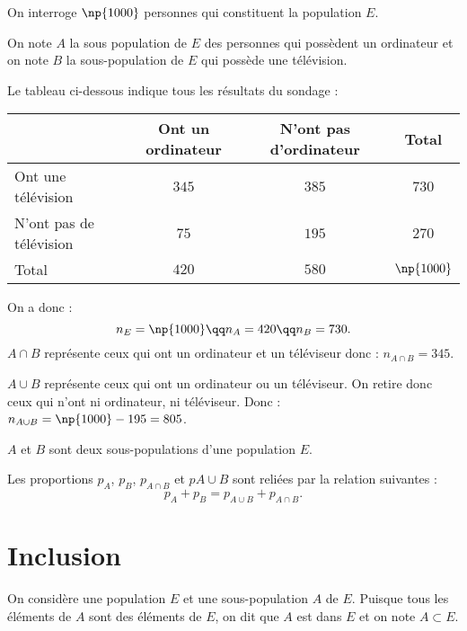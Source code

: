 \documentclass[10pt,openright,twoside,french]{book}
\begin{document}
\begin{Exemple}
    On interroge $\np{1000}$ personnes qui constituent la population $E$.\par
    On note $A$ la sous population de $E$ des personnes qui possèdent un ordinateur et on note $B$ la sous-population de $E$ qui possède une télévision.\par
    Le tableau ci-dessous indique tous les résultats du sondage :\medskip
    
    \begin{center}
    \renewcommand\arraystretch{1.5}
        \begin{tabular}{|l|c|c|c|}
            \cline{2-4}
                \multicolumn{1}{c|}{} & Ont un ordinateur & N'ont pas d'ordinateur & Total \\
            \hline
                Ont une télévision & $345$ & $385$ & $730$ \\
            \hline
                N'ont pas de télévision & $75$ & $195$ & $270$ \\
            \hline
                Total & $420$ & $580$ & $\np{1000}$ \\
            \hline
        \end{tabular}
    \end{center}
    On a donc :
    \[n_E = \np{1000} \qq n_A = 420 \qq n_B = 730.\]
    $A \cap B$ représente ceux qui ont un ordinateur et un téléviseur donc : $n_{A\cap B} = 345$.\par
    $A \cup B$ représente ceux qui ont un ordinateur ou un téléviseur. On retire donc ceux qui n'ont ni ordinateur, ni téléviseur. Donc : $n_{A \cup B} = \np{1000} - 195 = 805$.
\end{Exemple}

\begin{Prop}
    $A$ et $B$ sont deux sous-populations d'une population $E$.\par
    Les proportions $p_A$, $p_B$, $p_{A \cap B}$ et $p{A \cup B}$ sont reliées par la relation suivantes :
    \[p_A + p_B = p_{A\cup B} + p_{A\cap B}.\]
\end{Prop}

\section{Inclusion}

\begin{Defi}
    On considère une population $E$ et une sous-population $A$ de $E$. Puisque tous les éléments de $A$ sont des éléments de $E$, on dit que $A$ est  dans $E$ et on note $A \subset E$.
\end{Defi}
\end{document}
